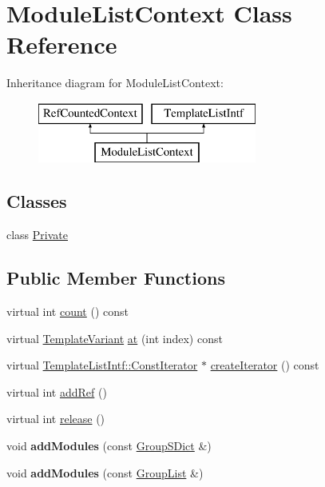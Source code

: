 \hypertarget{class_module_list_context}{}\section{Module\+List\+Context Class Reference}
\label{class_module_list_context}
Inheritance diagram for Module\+List\+Context\+:\begin{figure}[H]
\begin{center}
\leavevmode
\includegraphics[height=2.000000cm]{class_module_list_context}
\end{center}
\end{figure}
\subsection*{Classes}
\begin{DoxyCompactItemize}
\item 
class \mbox{\hyperlink{class_module_list_context_1_1_private}{Private}}
\end{DoxyCompactItemize}
\subsection*{Public Member Functions}
\begin{DoxyCompactItemize}
\item 
virtual int \mbox{\hyperlink{class_module_list_context_a65f2757f90eb682cb7551545f29f01ee}{count}} () const
\item 
virtual \mbox{\hyperlink{class_template_variant}{Template\+Variant}} \mbox{\hyperlink{class_module_list_context_a4548860492524e01ee703bd613fd08a7}{at}} (int index) const
\item 
virtual \mbox{\hyperlink{class_template_list_intf_1_1_const_iterator}{Template\+List\+Intf\+::\+Const\+Iterator}} $\ast$ \mbox{\hyperlink{class_module_list_context_a43d8a58bc49f64bf7bdc0b68c03c83f2}{create\+Iterator}} () const
\item 
virtual int \mbox{\hyperlink{class_module_list_context_a88f218226c4fc48cfa07d0e48568c4ce}{add\+Ref}} ()
\item 
virtual int \mbox{\hyperlink{class_module_list_context_a43785b9c64132a617e587d0181a5f4ae}{release}} ()
\item 
\mbox{\label{class_module_list_context_a27cb73cdd510c5e432a8ebe3ceb3d30a}} 
void {\bfseries add\+Modules} (const \mbox{\hyperlink{class_group_s_dict}{Group\+S\+Dict}} \&)
\item 
\mbox{\label{class_module_list_context_a94c78ad4a69fefc92435c334578a5dfe}} 
void {\bfseries add\+Modules} (const \mbox{\hyperlink{class_group_list}{Group\+List}} \&)
\end{DoxyCompactItemize}
